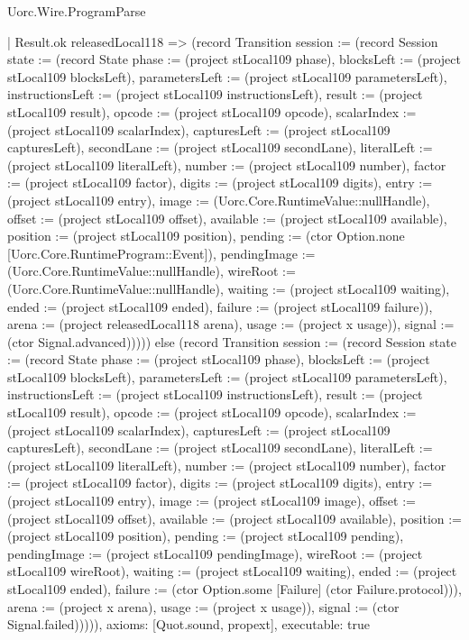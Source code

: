 \begin{lexlean}{Uorc.Wire.ProgramParse}
\begin{semanticmodule}
{      | Result.ok releasedLocal118 => (record Transition {session := (record Session {state := (record State {phase := (project stLocal109 phase), blocksLeft := (project stLocal109 blocksLeft), parametersLeft := (project stLocal109 parametersLeft), instructionsLeft := (project stLocal109 instructionsLeft), result := (project stLocal109 result), opcode := (project stLocal109 opcode), scalarIndex := (project stLocal109 scalarIndex), capturesLeft := (project stLocal109 capturesLeft), secondLane := (project stLocal109 secondLane), literalLeft := (project stLocal109 literalLeft), number := (project stLocal109 number), factor := (project stLocal109 factor), digits := (project stLocal109 digits), entry := (project stLocal109 entry), image := (Uorc.Core.RuntimeValue::nullHandle), offset := (project stLocal109 offset), available := (project stLocal109 available), position := (project stLocal109 position), pending := (ctor Option.none [Uorc.Core.RuntimeProgram::Event]), pendingImage := (Uorc.Core.RuntimeValue::nullHandle), wireRoot := (Uorc.Core.RuntimeValue::nullHandle), waiting := (project stLocal109 waiting), ended := (project stLocal109 ended), failure := (project stLocal109 failure)}), arena := (project releasedLocal118 arena), usage := (project x usage)}), signal := (ctor Signal.advanced)})))) else (record Transition {session := (record Session {state := (record State {phase := (project stLocal109 phase), blocksLeft := (project stLocal109 blocksLeft), parametersLeft := (project stLocal109 parametersLeft), instructionsLeft := (project stLocal109 instructionsLeft), result := (project stLocal109 result), opcode := (project stLocal109 opcode), scalarIndex := (project stLocal109 scalarIndex), capturesLeft := (project stLocal109 capturesLeft), secondLane := (project stLocal109 secondLane), literalLeft := (project stLocal109 literalLeft), number := (project stLocal109 number), factor := (project stLocal109 factor), digits := (project stLocal109 digits), entry := (project stLocal109 entry), image := (project stLocal109 image), offset := (project stLocal109 offset), available := (project stLocal109 available), position := (project stLocal109 position), pending := (project stLocal109 pending), pendingImage := (project stLocal109 pendingImage), wireRoot := (project stLocal109 wireRoot), waiting := (project stLocal109 waiting), ended := (project stLocal109 ended), failure := (ctor Option.some [Failure] (ctor Failure.protocol))}), arena := (project x arena), usage := (project x usage)}), signal := (ctor Signal.failed)})))),
  axioms: [Quot.sound, propext],
  executable: true
}


\end{semanticmodule}
\end{lexlean}

